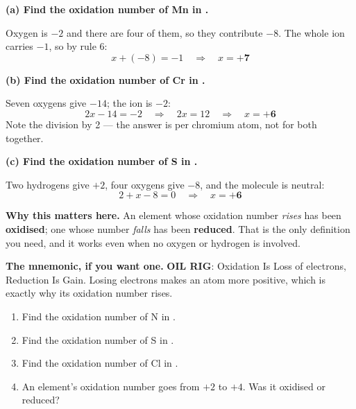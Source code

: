 \documentclass{apchem-worksheet}
\begin{document}
\begin{workedexample}
\textbf{(a) Find the oxidation number of Mn in .}

Oxygen is $-2$ and there are four of them, so they contribute $-8$. The
whole ion carries $-1$, so by rule 6:
\[ x + (-8) = -1 \quad\Longrightarrow\quad x = \mathbf{+7} \]

\textbf{(b) Find the oxidation number of Cr in .}

Seven oxygens give $-14$; the ion is $-2$:
\[ 2x - 14 = -2 \quad\Longrightarrow\quad 2x = 12
   \quad\Longrightarrow\quad x = \mathbf{+6} \]
Note the division by 2 --- the answer is per chromium atom, not for
both together.

\textbf{(c) Find the oxidation number of S in .}

Two hydrogens give $+2$, four oxygens give $-8$, and the molecule is
neutral:
\[ 2 + x - 8 = 0 \quad\Longrightarrow\quad x = \mathbf{+6} \]

\textbf{Why this matters here.} An element whose oxidation number
\emph{rises} has been \textbf{oxidised}; one whose number \emph{falls}
has been \textbf{reduced}. That is the only definition you need, and it
works even when no oxygen or hydrogen is involved.

\textbf{The mnemonic, if you want one.} \textbf{OIL RIG}: Oxidation Is
Loss of electrons, Reduction Is Gain. Losing electrons makes an atom
more positive, which is exactly why its oxidation number rises.
\end{workedexample}

\begin{yourturn}
\begin{enumerate}[leftmargin=*,itemsep=0.5em]
  \item Find the oxidation number of N in .
        \workspace[1.6cm]
  \item Find the oxidation number of S in .
        \workspace[1.6cm]
  \item Find the oxidation number of Cl in .
        \workspace[1.6cm]
  \item An element's oxidation number goes from $+2$ to $+4$. Was it
        oxidised or reduced? \workspace[1.6cm]
\end{enumerate}
\end{yourturn}
\end{document}
